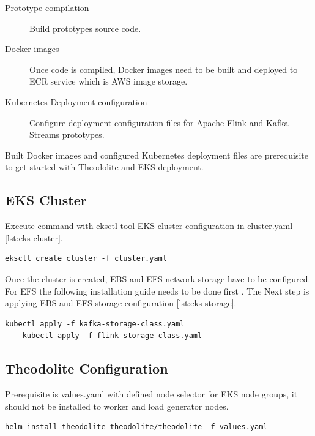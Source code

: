 \begin{description}
    \item[Prototype compilation] Build prototypes source code.
    \item[Docker images] Once code is compiled, Docker images need to be built and deployed
    to ECR \cite{awsECR} service which is AWS image storage.
    \item[Kubernetes Deployment configuration] Configure deployment configuration files for Apache Flink
    and Kafka Streams prototypes.
\end{description}

Built Docker images and configured Kubernetes deployment files are
prerequisite to get started with Theodolite and EKS deployment.

\subsection{EKS Cluster}\label{subsec:eks-cluster}
Execute command with eksctl tool EKS cluster configuration in cluster.yaml  \ref{lst:eks-cluster}.

\begin{lstlisting}[label={lst:eks-cluster}]
    eksctl create cluster -f cluster.yaml
\end{lstlisting}

Once the cluster is created, EBS and EFS network storage have to be configured.
For EFS the following installation guide needs to be done first \cite{awsEfsCsi}.
The Next step is applying EBS and EFS storage configuration \ref{lst:eks-storage}.

\begin{lstlisting}[label={lst:eks-storage}]
    kubectl apply -f kafka-storage-class.yaml
    kubectl apply -f flink-storage-class.yaml
\end{lstlisting}


\subsection{Theodolite Configuration}\label{subsec:theodolite-isntllation}
Prerequisite is values.yaml with defined node selector for EKS node groups,
it should not be installed to worker and load generator nodes.

\begin{lstlisting}[label={lst:theodolite-inst}]
    helm install theodolite theodolite/theodolite -f values.yaml
\end{lstlisting}

